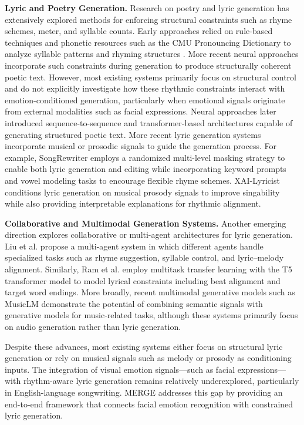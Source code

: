 \documentclass[11pt]{article}
\begin{document}
\textbf{Lyric and Poetry Generation.}
Research on poetry and lyric generation has extensively explored methods for enforcing structural constraints such as rhyme schemes, meter, and syllable counts. Early approaches relied on rule-based techniques and phonetic resources such as the CMU Pronouncing Dictionary to analyze syllable patterns and rhyming structures \cite{ghazvininejad2016generating, gonccalo2024automatic}. More recent neural approaches incorporate such constraints during generation to produce structurally coherent poetic text. However, most existing systems primarily focus on structural control and do not explicitly investigate how these rhythmic constraints interact with emotion-conditioned generation, particularly when emotional signals originate from external modalities such as facial expressions. Neural approaches later introduced sequence-to-sequence and transformer-based architectures capable of generating structured poetic text. More recent lyric generation systems incorporate musical or prosodic signals to guide the generation process. For example, SongRewriter \cite{sun2023songrewriter} employs a randomized multi-level masking strategy to enable both lyric generation and editing while incorporating keyword prompts and vowel modeling tasks to encourage flexible rhyme schemes. XAI-Lyricist \cite{liang2024xai} conditions lyric generation on musical prosody signals to improve singability while also providing interpretable explanations for rhythmic alignment.

\textbf{Collaborative and Multimodal Generation Systems.}
Another emerging direction explores collaborative or multi-agent architectures for lyric generation. Liu et al. \cite{liu2024agent} propose a multi-agent system in which different agents handle specialized tasks such as rhyme suggestion, syllable control, and lyric–melody alignment. Similarly, Ram et al. \cite{ram2021say} employ multitask transfer learning with the T5 transformer model to model lyrical constraints including beat alignment and target word endings. More broadly, recent multimodal generative models such as MusicLM \cite{huang2023musiclm} demonstrate the potential of combining semantic signals with generative models for music-related tasks, although these systems primarily focus on audio generation rather than lyric generation.

Despite these advances, most existing systems either focus on structural lyric generation or rely on musical signals such as melody or prosody as conditioning inputs. The integration of visual emotion signals—such as facial expressions—with rhythm-aware lyric generation remains relatively underexplored, particularly in English-language songwriting. MERGE addresses this gap by providing an end-to-end framework that connects facial emotion recognition with constrained lyric generation.
\end{document}
